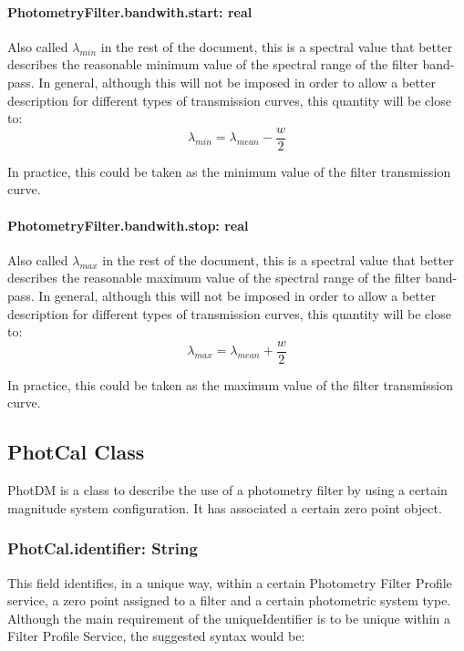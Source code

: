 \documentclass[11pt,a4paper]{ivoa}
\begin{document}
\paragraph{PhotometryFilter.bandwith.start: real}
Also called $\lambda_{min}$ in the rest of the document, this is a spectral value that better describes 
the reasonable minimum value of the spectral range of the filter band-pass. In general,
although this 
will not be imposed in order to allow a better description for different types of 
transmission curves, this quantity will be close to:
\begin{equation} \label{eq:22}
\lambda_{min} = \lambda_{mean} - \frac{w}{2}
\end{equation}

In practice, this could be taken as the minimum value of the filter transmission curve.
\par

\paragraph{PhotometryFilter.bandwith.stop: real}
Also called $\lambda_{max}$ in the rest of the document, this is a spectral value that 
better describes the reasonable maximum value of the spectral range of the filter band-pass. 
In general, 
although this will not be imposed in order to allow a better description for different 
types of transmission curves, this quantity will be close to:
\begin{equation} \label{eq:23}
\lambda_{max} = \lambda_{mean} + \frac{w}{2}
\end{equation}

In practice, this could be taken as the maximum value of the filter transmission 
curve.\par

\subsection{PhotCal Class}
PhotDM is a class to describe the use of a photometry filter by using a certain magnitude system 
configuration. It has associated a certain zero point object.
\par

\subsubsection{PhotCal.identifier: String}
This field identifies, in a unique way, within a certain Photometry Filter Profile 
service, a zero point assigned to a filter and a certain photometric system type. 
Although the main requirement of the uniqueIdentifier is to be unique within a Filter 
Profile Service, the suggested syntax would be:
\par
\end{document}
